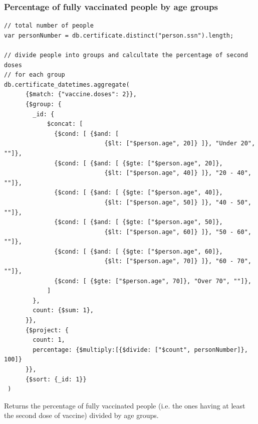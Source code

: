 \documentclass[12pt, a4paper]{article}
\begin{document}
\subsubsection{Percentage of fully vaccinated people by age groups}
\begin{tcolorbox}[fontupper=\scriptsize]
    \begin{verbatim}
// total number of people
var personNumber = db.certificate.distinct("person.ssn").length;

// divide people into groups and calcultate the percentage of second doses 
// for each group 
db.certificate_datetimes.aggregate(
      {$match: {"vaccine.doses": 2}},
      {$group: {
        _id: {
            $concat: [
              {$cond: [ {$and: [ 
                            {$lt: ["$person.age", 20]} ]}, "Under 20", ""]},
              {$cond: [ {$and: [ {$gte: ["$person.age", 20]}, 
                            {$lt: ["$person.age", 40]} ]}, "20 - 40", ""]},
              {$cond: [ {$and: [ {$gte: ["$person.age", 40]}, 
                            {$lt: ["$person.age", 50]} ]}, "40 - 50", ""]},
              {$cond: [ {$and: [ {$gte: ["$person.age", 50]}, 
                            {$lt: ["$person.age", 60]} ]}, "50 - 60", ""]},
              {$cond: [ {$and: [ {$gte: ["$person.age", 60]}, 
                            {$lt: ["$person.age", 70]} ]}, "60 - 70", ""]},
              {$cond: [ {$gte: ["$person.age", 70]}, "Over 70", ""]},
            ]
        },
        count: {$sum: 1},
      }},
      {$project: {
        count: 1,
        percentage: {$multiply:[{$divide: ["$count", personNumber]}, 100]}
      }},
      {$sort: {_id: 1}}
 )
    \end{verbatim}
\end{tcolorbox}
\noindent 
Returns the percentage of fully vaccinated people (i.e. the ones having at least the 
second dose of vaccine) divided by age groups.
\end{document}
